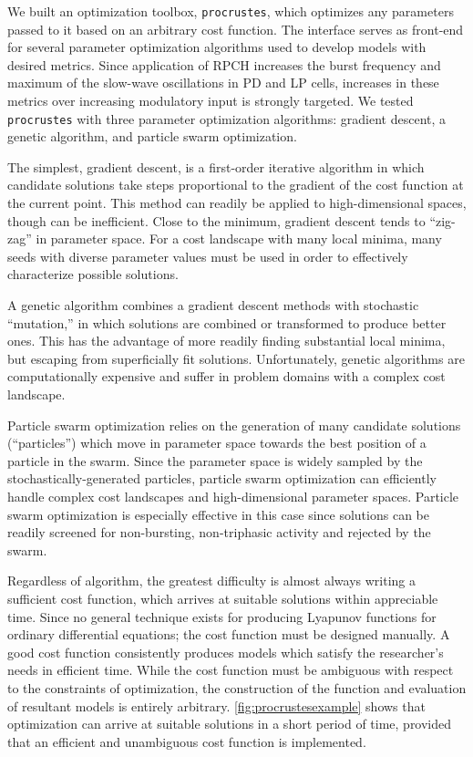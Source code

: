 
We built an optimization toolbox, \texttt{procrustes}, which optimizes any parameters passed to it based on an arbitrary cost function.  The interface serves as front-end for several parameter optimization algorithms used to develop models with desired metrics. Since application of \acs{RPCH} increases the burst frequency and maximum of the slow-wave oscillations in \acs{PD} and \acs{LP} cells, increases in these metrics over increasing modulatory input is strongly targeted. We tested \texttt{procrustes} with three parameter optimization algorithms: gradient descent, a genetic algorithm, and particle swarm optimization.

The simplest, gradient descent, is a first-order iterative algorithm in which candidate solutions take steps proportional to the gradient of the cost function at the current point. This method can readily be applied to high-dimensional spaces, though can be inefficient. Close to the minimum, gradient descent tends to ``zig-zag'' in parameter space. For a cost landscape with many local minima, many seeds with diverse parameter values must be used in order to effectively characterize possible solutions.

A genetic algorithm combines a gradient descent methods with stochastic ``mutation,'' in which solutions are combined or transformed to produce better ones. This has the advantage of more readily finding substantial local minima, but escaping from superficially fit solutions. Unfortunately, genetic algorithms are computationally expensive and suffer in problem domains with a complex cost landscape.

Particle swarm optimization relies on the generation of many candidate solutions (``particles'') which move in parameter space towards the best position of a particle in the swarm. Since the parameter space is widely sampled by the stochastically-generated particles, particle swarm optimization can efficiently handle complex cost landscapes and high-dimensional parameter spaces. Particle swarm optimization is especially effective in this case since solutions can be readily screened for non-bursting, non-triphasic activity and rejected by the swarm.

Regardless of algorithm, the greatest difficulty is almost always writing a sufficient cost function, which arrives at suitable solutions within appreciable time. Since no general technique exists for producing Lyapunov functions for ordinary differential equations; the cost function must be designed manually. A good cost function consistently produces models which satisfy the researcher's needs in efficient time. While the cost function must be ambiguous with respect to the constraints of optimization, the construction of the function and evaluation of resultant models is entirely arbitrary. \autoref{fig:procrustesexample} shows that optimization can arrive at suitable solutions in a short period of time, provided that an efficient and unambiguous cost function is implemented.


